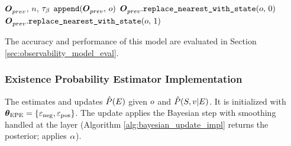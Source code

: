 \begin{singlespace}
\begin{algorithm}[H]
    \caption[KNN Model Integrate]{KNN $\integrate{\observation, \feedback}$}
    \label{alg:knn_update}
    \begin{algorithmic}
        \Require $\boldsymbol{O}^{}_{prev}$, $n$, $\tau_{\text{\ensuremath{\beta}}}$
                \State $\texttt{append}(\boldsymbol{O}^{}_{prev},\, o)$
                \State \Return
            \EndIf
            \If{$|\feedback| < \feedbackthreshold$}
                \State \Return {}
            \EndIf
             
                \State $\boldsymbol{O}^{}_{prev}.\texttt{replace\_nearest\_with\_state}(o,\, 0)$
            \Else {}
                \State $\boldsymbol{O}^{}_{prev}.\texttt{replace\_nearest\_with\_state}(o,\, 1)$
            \EndIf
            \State \Return
        \EndFunction
    \end{algorithmic}
\end{algorithm}
\end{singlespace}

The accuracy and performance of this model are evaluated in Section \ref{sec:observability_model_eval}.

\subsubsection{Existence Probability Estimator Implementation}
\label{sec:existence_confidence}

The \epe{} estimates and updates \(\hat{P}(E)\) given \(o\) and \(\hat{P}(S,v|E)\). It is initialized with \(\boldsymbol{\theta}_{\text{EPE}}=\{\varepsilon_{\text{neg}},\varepsilon_{\text{pos}}\}\). The update applies the Bayesian step with smoothing handled at the \vbee{} layer (Algorithm \ref{alg:bayesian_update_impl} returns the posterior; \vbee{} applies \(\alpha\)).

